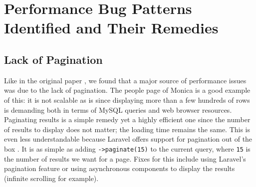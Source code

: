 \documentclass[sigconf]{acmart}
\begin{document}
\section{Performance Bug Patterns Identified and Their Remedies}
\subsection{Lack of Pagination}
Like in the original paper \cite{paper}, we found that a major source of performance issues was due to the lack of pagination. The people page of Monica is a good example of this: it is not scalable as is since displaying more than a few hundreds of rows is demanding both in terms of MySQL queries and web browser resources. Paginating results is a simple remedy yet a highly efficient one since the number of results to display does not matter; the loading time remains the same. This is even less understandable because Laravel offers support for pagination out of the box \cite{pagination}. It is as simple as adding \texttt{->paginate(15)} to the current query, where \texttt{15} is the number of results we want for a page. Fixes for this include using Laravel's pagination feature or using asynchronous components to display the results (infinite scrolling for example).
\end{document}
